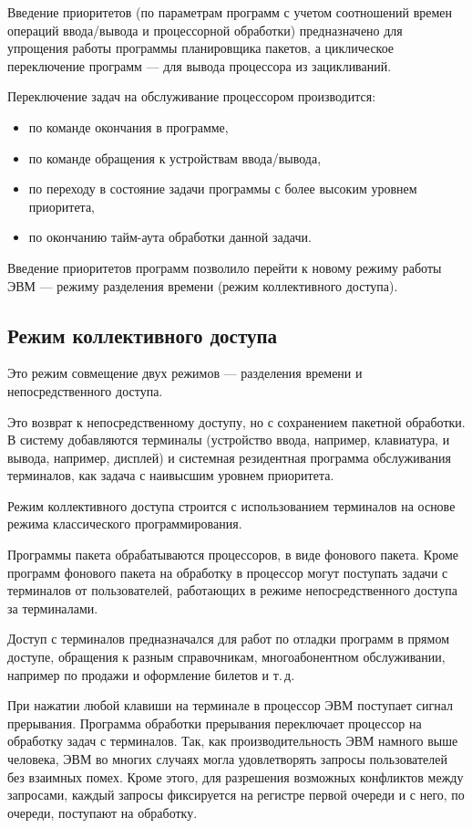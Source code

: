 \documentclass[a4paper, 10pt, notitlepage, pdftex,headsepline]{scrartcl}
\begin{document}
    Введение приоритетов (по параметрам программ с учетом соотношений
    времен операций ввода/вывода и процессорной обработки) предназначено
    для упрощения работы программы планировщика пакетов, а циклическое
    переключение программ --- для вывода процессора из зацикливаний.

    Переключение задач на обслуживание процессором производится:
    \begin{itemize}
      \item по команде окончания в программе,
      \item по команде обращения к устройствам ввода/вывода,
      \item по переходу в состояние задачи программы с более высоким
        уровнем приоритета,
      \item по окончанию тайм-аута обработки данной задачи.
    \end{itemize}

    Введение приоритетов программ позволило перейти к новому режиму
    работы ЭВМ --- режиму разделения времени (режим коллективного
    доступа).
  \subsection{Режим коллективного доступа}
    Это режим совмещение двух режимов --- разделения времени и
    непосредственного доступа.

    Это возврат к непосредственному доступу, но с сохранением пакетной
    обработки.
    В систему добавляются терминалы (устройство ввода, например,
    клавиатура, и вывода, например, дисплей) и системная резидентная
    программа обслуживания терминалов, как задача с наивысшим уровнем
    приоритета.

    Режим коллективного доступа строится с использованием терминалов на
    основе режима классического программирования.

    Программы пакета обрабатываются процессоров, в виде фонового пакета.
    Кроме программ фонового пакета на обработку в процессор могут
    поступать задачи с терминалов от пользователей, работающих в режиме
    непосредственного доступа за терминалами.

    Доступ с терминалов предназначался для работ по отладки программ в
    прямом доступе, обращения к разным справочникам, многоабонентном
    обслуживании, например по продажи и оформление билетов и т.\,д.

    При нажатии любой клавиши на терминале в процессор ЭВМ поступает
    сигнал прерывания.
    Программа обработки прерывания переключает процессор на обработку
    задач с терминалов.
    Так, как производительность ЭВМ намного выше человека, ЭВМ во многих
    случаях могла удовлетворять запросы пользователей без взаимных помех.
    Кроме этого, для разрешения возможных конфликтов между запросами,
    каждый запросы фиксируется на регистре первой очереди и с него, по
    очереди, поступают на обработку.
\end{document}
